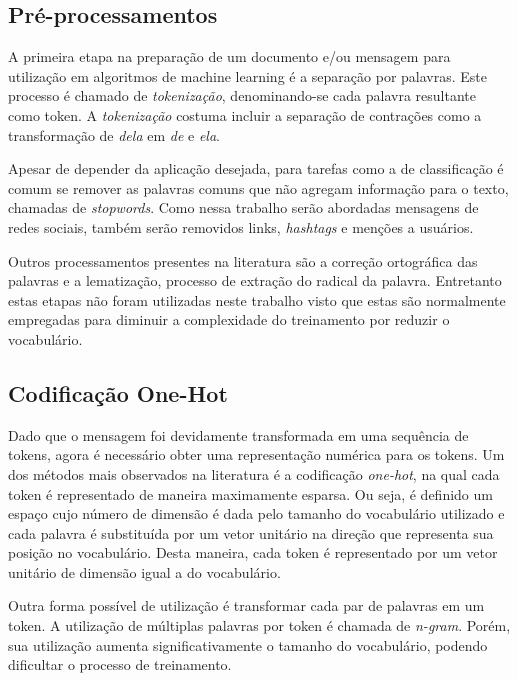 
\subsection{Pré-processamentos}

A primeira etapa na preparação de um documento e/ou mensagem para utilização em algoritmos de machine learning é a
separação por palavras.
Este processo é chamado de \textit{tokenização}, denominando-se cada palavra resultante como token.
A \textit{tokenização} costuma incluir a separação de contrações como a transformação de \textit{dela} em \textit{de}
e \textit{ela}.

Apesar de depender da aplicação desejada, para tarefas como a de classificação é comum se remover as palavras comuns que
não agregam informação para o texto, chamadas de \textit{stopwords}.
Como nessa trabalho serão abordadas mensagens de redes sociais, também serão removidos links, \textit{hashtags} e menções
a usuários.

Outros processamentos presentes na literatura são a correção ortográfica das palavras e a lematização, processo de
extração do radical da palavra.
Entretanto estas etapas não foram utilizadas neste trabalho visto que estas são normalmente empregadas para diminuir a
complexidade do treinamento por reduzir o vocabulário.

\subsection{Codificação One-Hot}

Dado que o mensagem foi devidamente transformada em uma sequência de tokens, agora é necessário obter uma representação
numérica para os tokens.
Um dos métodos mais observados na literatura é a codificação \textit{one-hot}, na qual cada token é representado de
maneira maximamente esparsa.
Ou seja, é definido um espaço cujo número de dimensão é dada pelo tamanho do vocabulário utilizado e cada palavra é
substituída por um vetor unitário na direção que representa sua posição no vocabulário.
Desta maneira, cada token é representado por um vetor unitário de dimensão igual a do vocabulário.

Outra forma possível de utilização é transformar cada par de palavras em um token.
A utilização de múltiplas palavras por token é chamada de \textit{n-gram}.
Porém, sua utilização aumenta significativamente o tamanho do vocabulário, podendo dificultar o processo de treinamento.

